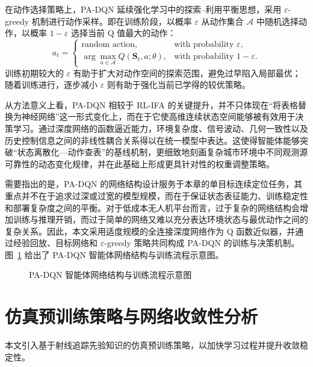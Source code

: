 在动作选择策略上，PA-DQN 延续强化学习中的探索--利用平衡思想，采用 \(\varepsilon\)-greedy 机制进行动作采样。即在训练阶段，以概率 \(\varepsilon\) 从动作集合 \(\mathcal{A}\) 中随机选择动作，以概率 \(1-\varepsilon\) 选择当前 Q 值最大的动作：
\begin{equation}
a_t=
\begin{cases}
\text{random action}, & \text{with probability } \varepsilon,\\
\arg\max\limits_{a\in\mathcal{A}}Q(\mathbf{S}_t,a;\theta), & \text{with probability } 1-\varepsilon.
\end{cases}
\label{eq:3_4_4_egreedy}
\end{equation}
训练初期较大的 \(\varepsilon\) 有助于扩大对动作空间的探索范围，避免过早陷入局部最优；随着训练进行，逐步减小 \(\varepsilon\) 则有助于强化当前已学得的较优策略。

从方法意义上看，PA-DQN 相较于 RL-IFA 的关键提升，并不只体现在“将表格替换为神经网络”这一形式变化上，而在于它使高维连续状态空间能够被有效用于决策学习。通过深度网络的函数逼近能力，环境复杂度、信号波动、几何一致性以及历史控制信息之间的非线性耦合关系得以在统一模型中表达。这使得智能体能够突破“状态离散化—动作查表”的基线机制，更细致地刻画复杂城市环境中不同观测源可靠性的动态变化规律，并在此基础上形成更具针对性的权重调整策略。

需要指出的是，PA-DQN 的网络结构设计服务于本章的单目标连续定位任务，其重点并不在于追求过深或过宽的模型规模，而在于保证状态表征能力、训练稳定性和部署复杂度之间的平衡。对于低成本无人机平台而言，过于复杂的网络结构会增加训练与推理开销，而过于简单的网络又难以充分表达环境状态与最优动作之间的复杂关系。因此，本文采用适度规模的全连接深度网络作为 Q 函数近似器，并通过经验回放、目标网络和 \(\varepsilon\)-greedy 策略共同构成 PA-DQN 的训练与决策机制。图~\ref{fig:pa_dqn_network_structure} 给出了 PA-DQN 智能体网络结构与训练流程示意图。

\begin{figure}[htbp]
    \centering
    \vspace{4.5cm}
    \caption{PA-DQN 智能体网络结构与训练流程示意图}
    \label{fig:pa_dqn_network_structure}
\end{figure}

\section{仿真预训练策略与网络收敛性分析}
\label{sec:3_5}

本文引入基于射线追踪先验知识的仿真预训练策略，以加快学习过程并提升收敛稳定性。

